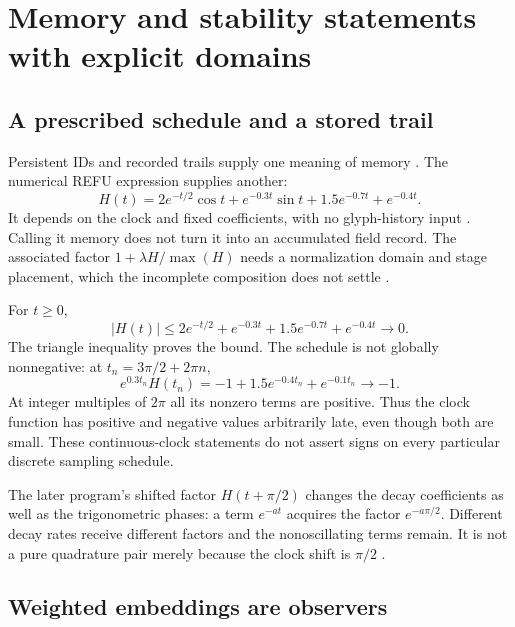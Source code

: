 \documentclass[11pt,a4paper]{article}
\theoremstyle{definition}
\numberwithin{equation}{section}
\begin{document}
\section{Memory and stability statements with explicit domains}
\label{sec:memory}

\subsection{A prescribed schedule and a stored trail}

Persistent IDs and recorded trails supply one meaning of memory
\cite[physical pp.~2,6]{P01} \cite[physical p.~2]{P03}.
The numerical REFU expression supplies another:
\begin{equation}
 H(t)=2e^{-t/2}\cos t+e^{-0.3t}\sin t+
       1.5e^{-0.7t}+e^{-0.4t}.
 \label{eq:H}
\end{equation}
It depends on the clock and fixed coefficients, with no glyph-history
input \cite[physical p.~6, \S3.1]{P07} \cite[lines 5--13]{REFU}.
Calling it memory does not turn it into an accumulated field record.
The associated factor $1+\lambda H/\max(H)$ needs a normalization domain
and stage placement, which the incomplete composition does not settle
\cite[physical pp.~5--6]{P07}.

For $t\geq0$,
\begin{equation}
 |H(t)|\leq
 2e^{-t/2}+e^{-0.3t}+1.5e^{-0.7t}+e^{-0.4t}\longrightarrow0.
 \label{eq:H-bound}
\end{equation}
The triangle inequality proves the bound. The schedule is not globally
nonnegative: at $t_n=3\pi/2+2\pi n$,
\begin{equation}
 e^{0.3t_n}H(t_n)
 =-1+1.5e^{-0.4t_n}+e^{-0.1t_n}\longrightarrow-1.
 \label{eq:H-sign}
\end{equation}
At integer multiples of $2\pi$ all its nonzero terms are positive.
Thus the clock function has positive and negative values arbitrarily late,
even though both are small. These continuous-clock statements do not
assert signs on every particular discrete sampling schedule.

The later program's shifted factor $H(t+\pi/2)$ changes the decay
coefficients as well as the trigonometric phases: a term $e^{-at}$
acquires the factor $e^{-a\pi/2}$. Different decay rates receive different
factors and the nonoscillating terms remain. It is not a pure quadrature
pair merely because the clock shift is $\pi/2$
\cite[lines 176--182]{Infinity}.

\subsection{Weighted embeddings are observers}
\end{document}
